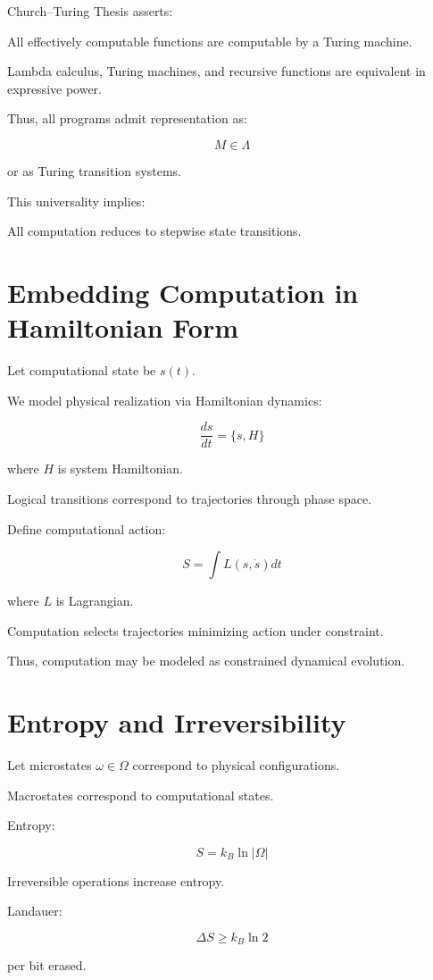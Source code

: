 \documentclass[11pt,openany]{book}
\begin{document}
Church--Turing Thesis asserts:

All effectively computable functions are computable by a Turing machine.

Lambda calculus, Turing machines, and recursive functions
are equivalent in expressive power.

Thus, all programs admit representation as:

\[
M \in \Lambda
\]

or as Turing transition systems.

This universality implies:

All computation reduces to stepwise state transitions.

\section{Embedding Computation in Hamiltonian Form}

Let computational state be $s(t)$.

We model physical realization via Hamiltonian dynamics:

\[
\frac{ds}{dt} = \{ s, H \}
\]

where $H$ is system Hamiltonian.

Logical transitions correspond to trajectories through phase space.

Define computational action:

\[
S = \int L(s, \dot{s}) dt
\]

where $L$ is Lagrangian.

Computation selects trajectories minimizing action under constraint.

Thus, computation may be modeled as constrained dynamical evolution.

\section{Entropy and Irreversibility}

Let microstates $\omega \in \Omega$ correspond to physical configurations.

Macrostates correspond to computational states.

Entropy:

\[
S = k_B \ln |\Omega|
\]

Irreversible operations increase entropy.

Landauer:

\[
\Delta S \geq k_B \ln 2
\]

per bit erased.
\end{document}
